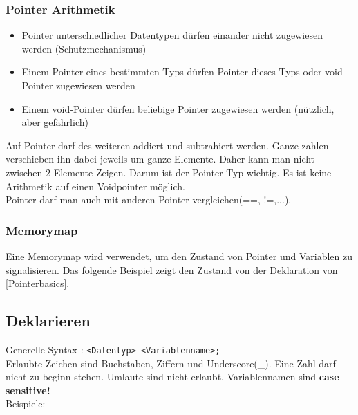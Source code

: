 

\subsubsection{Pointer Arithmetik}

\begin{itemize}[itemsep=1pt, parsep=0pt]
    \item Pointer unterschiedlicher Datentypen dürfen einander nicht zugewiesen werden (Schutzmechanismus)
    \item Einem Pointer eines bestimmten Typs dürfen Pointer dieses Typs oder void-Pointer zugewiesen werden
    \item Einem void-Pointer dürfen beliebige Pointer zugewiesen werden (nützlich, aber gefährlich)
\end{itemize}
Auf Pointer darf des weiteren addiert und subtrahiert werden. Ganze zahlen verschieben ihn dabei jeweils um ganze Elemente. 
Daher kann man nicht zwischen 2 Elemente Zeigen. Darum ist der Pointer Typ wichtig. 
Es ist keine Arithmetik auf einen Voidpointer möglich.\\
Pointer darf man auch mit anderen Pointer vergleichen(==, !=,...).

\nextcol

\subsubsection{Memorymap}

Eine Memorymap wird verwendet, um den Zustand von Pointer und Variablen zu signalisieren. 
Das folgende Beispiel zeigt den Zustand von der Deklaration von \ref{Pointerbasics}.\\
\begin{center}
\end{center}

\subsection{Deklarieren}

Generelle Syntax : \verb|<Datentyp> <Variablenname>;|\\
Erlaubte Zeichen sind Buchstaben, Ziffern und Underscore(\_). Eine Zahl darf nicht zu beginn stehen. Umlaute sind nicht erlaubt. Variablennamen sind \textbf{case sensitive!}\\
Beispiele:

